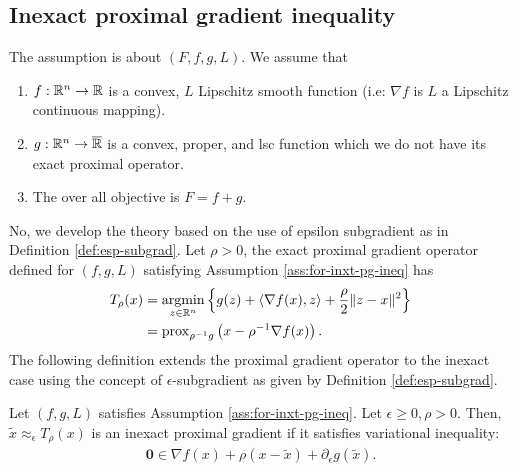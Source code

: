 \documentclass[12pt]{article}
\begin{document}
    \subsection{Inexact proximal gradient inequality}
        \begin{assumption}\label{ass:for-inxt-pg-ineq}
            The assumption is about $(F, f, g, L)$. 
            We assume that 
            \begin{enumerate}[nosep]
                \item $f: \mathbb R^n \rightarrow \mathbb R$ is a convex, $L$ Lipschitz smooth function (i.e: $\nabla f$ is $L$ a Lipschitz continuous mapping). 
                \item $g: \mathbb R^n \rightarrow \overline{\mathbb R}$ is a convex, proper, and lsc function which we do not have its exact proximal operator. 
                \item The over all objective is $F = f + g$. 
            \end{enumerate}
        \end{assumption}
        No, we develop the theory based on the use of epsilon subgradient as in Definition \ref{def:esp-subgrad}. 
        Let $\rho > 0$, the exact proximal gradient operator defined for $(f, g, L)$ satisfying Assumption \ref{ass:for-inxt-pg-ineq} has
        \begin{align*}
            T_{\rho}(x) &= \mathop{\rm argmin}\limits_{z\in\mathbb R^n}\left\lbrace g(z) + \langle \nabla f(x), z\rangle + \frac{\rho}{2}\Vert z - x\Vert^2 \right\rbrace
            \\
            &= \operatorname{prox}_{\rho^{-1} g}\left(x - \rho^{-1}\nabla f(x)\right). 
        \end{align*}
        The following definition extends the proximal gradient operator to the inexact case using the concept of $\epsilon$-subgradient as given by Definition \ref{def:esp-subgrad}. 
        \begin{definition}\label{def:inxt-pg}
            Let $(f, g, L)$ satisfies Assumption \ref{ass:for-inxt-pg-ineq}. 
            Let $\epsilon \ge 0, \rho > 0$. 
            Then, $\tilde x \approx_\epsilon T_\rho(x)$ is an inexact proximal gradient if it satisfies variational inequality: 
            \begin{align*}
                \mathbf 0 \in \nabla f(x) + \rho(x - \tilde x) + \partial_{\epsilon} g(\tilde x). 
            \end{align*}
        \end{definition}
\end{document}
